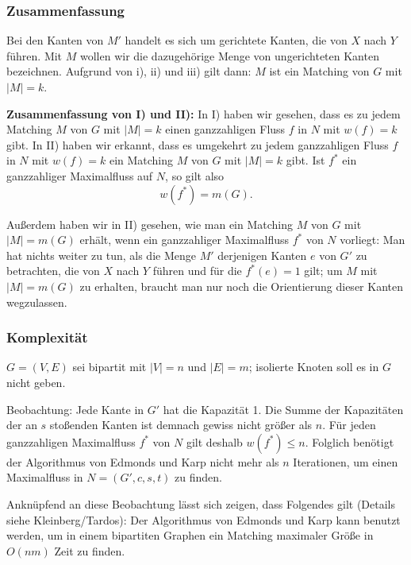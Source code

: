 \documentclass[smaller]{beamer}
\begin{document}
\begin{frame}
 \frametitle{Zusammenfassung}
 Bei den Kanten von $M'$ handelt es sich um gerichtete Kanten, die von $X$ nach $Y$ führen. Mit $M$ wollen wir die dazugehörige Menge von ungerichteten Kanten bezeichnen. Aufgrund von i), ii) und iii) gilt dann: \alert{$M$ ist ein Matching von $G$ mit $|M|=k$}. \\ \vspace*{0.2cm}

\textbf{Zusammenfassung von I) und II):} In I) haben wir gesehen, dass es zu jedem Matching $M$ von $G$ mit $|M|=k$ einen ganzzahligen Fluss $f$ in $N$ mit $w(f)=k$ gibt. In II) haben wir erkannt, dass es umgekehrt zu jedem ganzzahligen Fluss $f$ in $N$ mit $w(f)=k$ ein Matching $M$ von $G$ mit $|M|=k$ gibt. Ist $f^*$ ein ganzzahliger Maximalfluss auf $N$, so gilt also
\[
w(f^*) = m(G).
\]

Außerdem haben wir in II) gesehen, wie man ein Matching $M$ von $G$ mit $|M|=m(G)$ erhält, wenn ein ganzzahliger Maximalfluss $f^*$ von $N$ vorliegt: Man hat nichts weiter zu tun, als die Menge $M'$ derjenigen Kanten $e$ von $G'$ zu betrachten, die von $X$ nach $Y$ führen und für die $f^*(e)=1$ gilt; um $M$ mit $|M| = m(G)$ zu erhalten, braucht man nur noch die Orientierung dieser Kanten wegzulassen.
\end{frame}

\begin{frame}
 \frametitle{Komplexität}
$G=(V,E)$ sei bipartit mit $|V|=n$ und $|E|=m$; isolierte Knoten soll es in $G$ nicht geben. \\ \vspace*{0.2cm}

\alert{Beobachtung:} Jede Kante in $G'$ hat die Kapazität 1. Die Summe der Kapazitäten der an $s$ stoßenden Kanten ist demnach gewiss nicht größer als $n$. Für jeden ganzzahligen Maximalfluss $f^*$ von $N$ gilt deshalb $w(f^*) \leq n$. Folglich benötigt der Algorithmus von Edmonds und Karp nicht mehr als $n$ Iterationen, um einen Maximalfluss in $N=(G',c,s,t)$ zu finden. \\ \vspace*{0.2cm}

Anknüpfend an diese Beobachtung lässt sich zeigen, dass Folgendes gilt (Details siehe Kleinberg/Tardos): Der Algorithmus von Edmonds und Karp kann benutzt werden, um in einem bipartiten Graphen ein Matching maximaler Größe in $O(nm)$ Zeit zu finden. 
\end{frame}
\end{document}

